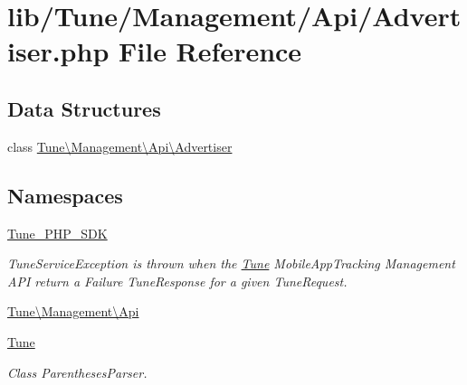 \hypertarget{Advertiser_8php}{\section{lib/\-Tune/\-Management/\-Api/\-Advertiser.php File Reference}
\label{Advertiser_8php}
}
\subsection*{Data Structures}
\begin{DoxyCompactItemize}
\item 
class \hyperlink{classTune_1_1Management_1_1Api_1_1Advertiser}{Tune\textbackslash{}\-Management\textbackslash{}\-Api\textbackslash{}\-Advertiser}
\end{DoxyCompactItemize}
\subsection*{Namespaces}
\begin{DoxyCompactItemize}
\item 
\hyperlink{namespaceTune__PHP__SDK}{Tune\-\_\-\-P\-H\-P\-\_\-\-S\-D\-K}
\begin{DoxyCompactList}\small\item\em Tune\-Service\-Exception is thrown when the \hyperlink{namespaceTune}{Tune} Mobile\-App\-Tracking Management A\-P\-I return a Failure Tune\-Response for a given Tune\-Request. \end{DoxyCompactList}\item 
\hyperlink{namespaceTune_1_1Management_1_1Api}{Tune\textbackslash{}\-Management\textbackslash{}\-Api}
\item 
\hyperlink{namespaceTune}{Tune}
\begin{DoxyCompactList}\small\item\em Class Parentheses\-Parser. \end{DoxyCompactList}\end{DoxyCompactItemize}

